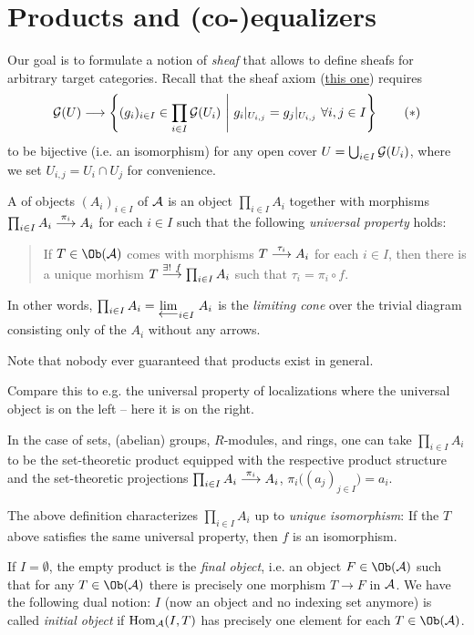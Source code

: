 \documentclass[a4paper,parskip=half,numbers=enddot, DIV=12]{scrreprt}
\begin{document}
  \section{Products and (co-)equalizers}
  Our goal is to formulate a notion of \emph{sheaf} that allows to define sheafs for arbitrary target categories. Recall that the sheaf axiom (\hyperref[sheafAxiom]{this one}) requires
  \begin{align}\lbl{eq:sheafAxiom}
  	\Gg(U)\longrightarrow\left\{(g_i)_{i\in I}\in\prod_{i\in I}\Gg(U_i)\st g_i|_{U_{i,j}}=g_j|_{U_{i,j}}\ \forall i,j\in I\right\}\tag{$*$}
  \end{align}
  to be bijective (i.e. an isomorphism) for any open cover $U=\bigcup_{i\in I}\mathcal{G}(U_i)$, where we set $U_{i,j}=U_i\cap U_j$ for convenience.
  
  \begin{defi}[Products]
  	A  of objects $(A_i)_{i\in I}$ of $\mathcal{A}$ is an object $\prod_{i\in I}A_i$ together with morphisms $\prod_{i\in I}A_i\morphism[\pi_i]A_i$ for each $i\in I$ such that the following \emph{universal property} holds:
  	\begin{quote}
  		If $T\in\Ob(\Aa)$ comes with morphisms $T\morphism[\tau_i]A_i$ for each $i\in I$, then there is a unique morhism $T\morphism[\exists!\ f]\prod_{i\in I}A_i$ such that $\tau_i=\pi_i\circ f$.
  	\end{quote}
  	In other words, $\prod_{i\in I}A_i=\limit[i\in I]{A_i}$ is the \emph{limiting cone} over the trivial diagram consisting only of the $A_i$ without any arrows.
  \end{defi}
  Note that nobody ever guaranteed that products exist in general.
  \begin{rem*}
  	\begin{alphanumerate}
  		\item Compare this to e.g. the universal property of localizations where the universal object is on the left -- here it is on the right.
  		\item In the case of sets, (abelian) groups, $R$-modules, and rings, one can take $\prod_{i\in I}A_i$ to be the set-theoretic product equipped with the respective product structure and the set-theoretic projections $\prod_{i\in I}A_i\morphism[\pi_i]A_i$, $\pi_i\big((a_j)_{j\in I}\big)=a_i$.
  		\item The above definition characterizes $\prod_{i\in I}A_i$ up to \emph{unique isomorphism}: If the $T$ above satisfies the same universal property, then $f$ is an isomorphism.
  		\item If $I=\emptyset$, the empty product is the \emph{final object}, i.e. an object $F\in\Ob(\Aa)$ such that for any $T\in\Ob(\Aa)$ there is precisely one morphism $T\to F$ in $\mathcal{A}$. We have the following dual notion: $I$ (now an object and no indexing set anymore) is called \emph{initial object} if $\operatorname{Hom}_{\mathcal{A}}(I,T)$ has precisely one element for each $T\in\Ob(\Aa)$.
  	\end{alphanumerate}
  \end{rem*}
\end{document}
